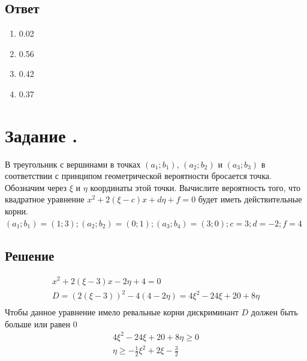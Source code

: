\documentclass[12pt]{article}
\begin{document}
\subsection*{Ответ}
\begin{enumerate}
	\item 0.02
	\item 0.56
	\item 0.42
	\item 0.37
\end{enumerate}

\newpage
\section*{Задание .}
В треугольник с вершинами в точках $(a_1;b_1)$, $(a_2;b_2)$ и $(a_3; b_3)$ в соответствии с принципом геометрической вероятности бросается точка.
Обозначим через $\xi$ и $\eta$ координаты этой точки.
Вычислите вероятность того, что квадратное уравнение $x^2 + 2(\xi - c)x + d\eta + f = 0$ будет иметь действительные корни. \\
$(a_1;b_1)=(1;3); (a_2;b_2)=(0;1); (a_3;b_4)=(3;0); c = 3; d = -2; f = 4$

\subsection*{Решение}
\begin{gather*}
	x^2 + 2(\xi - 3)x - 2\eta + 4 = 0 \\
	D = (2(\xi - 3))^2 - 4(4 - 2\eta) = 4\xi^2 - 24\xi + 20 + 8\eta \\
\end{gather*}
Чтобы данное уравнение имело ревальные корни дискриминант $D$ должен быть больше или равен 0
\begin{gather*}
	4\xi^2 - 24\xi + 20 + 8\eta \geq 0 \\
	\eta \geq -\frac{1}{2} \xi^2 + 2\xi - \frac{3}{2}
\end{gather*}
\end{document}

